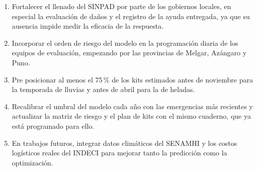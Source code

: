 \documentclass[12pt,a4paper]{article}
\begin{document}
\begin{enumerate}
\item Fortalecer el llenado del SINPAD por parte de los gobiernos locales, en especial la evaluación de daños y el
registro de la ayuda entregada, ya que su ausencia impide medir la eficacia de la respuesta.
\item Incorporar el orden de riesgo del modelo en la programación diaria de los equipos de evaluación, empezando por las
provincias de Melgar, Azángaro y Puno.
\item Pre posicionar al menos el 75\,\% de los kits estimados antes de noviembre para la temporada de lluvias y antes de
abril para la de heladas.
\item Recalibrar el umbral del modelo cada año con las emergencias más recientes y actualizar la matriz de riesgo y el
plan de kits con el mismo cuaderno, que ya está programado para ello.
\item En trabajos futuros, integrar datos climáticos del SENAMHI y los costos logísticos reales del INDECI para mejorar
tanto la predicción como la optimización.
\end{enumerate}

\end{document}
